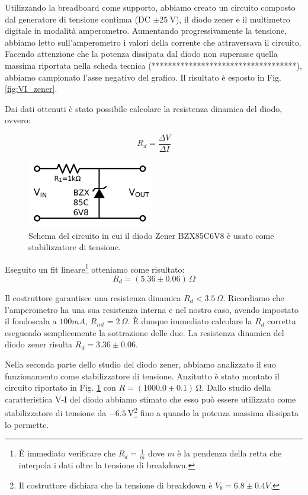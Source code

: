 Utilizzando la breadboard come supporto, abbiamo creato un circuito composto dal generatore di tensione continua (DC $\pm \SI{25}{\volt}$), il diodo zener e il multimetro digitale in modalità amperometro. Aumentando progressivamente la tensione, abbiamo letto sull'amperometro i valori della corrente che attraversava il circuito.
Facendo attenzione che la potenza dissipata dal diodo non superasse quella massima riportata nella scheda tecnica (***********************************), abbiamo campionato l'asse negativo del grafico. Il risultato è esposto in Fig. \ref{fig:VI_zener}.

Dai dati ottenuti è stato possibile calcolare la resistenza dinamica del diodo, ovvero:

\begin{equation}
R_d=\frac{\Delta V}{\Delta I}
\label{scemopagliaccio}
\end{equation}

\begin{figure}
	\includegraphics[width=55mm]{schema_zener.pdf}
	\caption{Schema del circuito in cui il diodo Zener BZX85C6V8 è usato come stabilizzatore di tensione.}
	\label{fig:schema_zener}
\end{figure}

Eseguito un fit lineare\footnote{È immediato verificare che $R_d=\frac{1}{m}$ dove $m$ è la pendenza della retta che interpola i dati oltre la tensione di breakdown.} otteniamo come risultato:
$$R_d= (5.36 \pm 0.06)\,\Omega$$

Il costruttore garantisce una resistenza dinamica $R_d<3.5 \, \Omega$. Ricordiamo che l'amperometro ha una sua resistenza interna e nel nostro caso, avendo impostato il fondoscala a $100mA$, $R_{int}=2\, \Omega$. È dunque immediato calcolare la $R_d$ corretta eseguendo semplicemente la sottrazione delle due. La resistenza dinamica del diodo zener risulta $R_d=3.36 \pm 0.06$.

Nella seconda parte dello studio del diodo zener, abbiamo analizzato il suo funzionamento come stabilizzatore di tensione. Anzitutto è stato montato il circuito riportato in Fig. \ref{fig:schema_zener} con $R = (1000.0 \pm 0.1) \, \si{\ohm}$.  Dallo studio della caratteristica V-I del diodo abbiamo stimato che esso può essere utilizzato come stabilizzatore di tensione da $\SI{-6.5}{\volt}$\footnote{Il costruttore dichiara che la tensione di breakdown è $V_b=6.8 \pm 0.4 V$.} fino a quando la potenza massima dissipata lo permette. 

